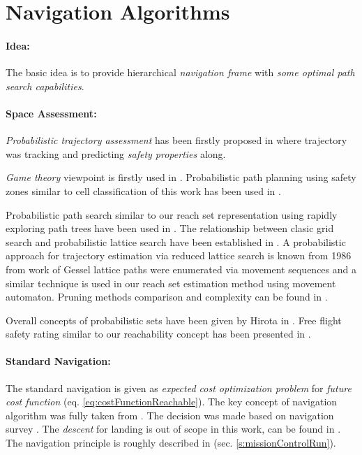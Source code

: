 \newpage
\section{Navigation Algorithms}\label{s:NavigationAlgorithms}
\paragraph{Idea:} The basic idea is to provide hierarchical \emph{navigation frame} with \emph{some optimal path search capabilities}. 


\paragraph{Space Assessment:}\emph{Probabilistic trajectory assessment} has been firstly proposed in \cite{kim2007uav} where trajectory was tracking and predicting \emph{safety properties} along. 

\emph{Game theory} viewpoint is firstly used in \cite{vidal2002probabilistic}. Probabilistic path planning using safety zones similar to cell classification of this work has been used in \cite{pfeiffer2005path}.

Probabilistic path search similar to our reach set representation using rapidly exploring path trees have been used in \cite{kothari2013probabilistically,blackmore2006probabilistic}. The relationship between clasic grid search and probabilistic lattice search have been established in \cite{lavalle2004relationship}. A probabilistic approach for trajectory estimation via reduced lattice search is known from 1986 from work of Gessel \cite{gessel1986probabilistic} lattice paths were enumerated via movement sequences and a similar technique is used in our reach set estimation method using movement automaton.  Pruning methods comparison and complexity can be found in \cite{esposito1997comparative}.

Overall concepts of probabilistic sets have been given by Hirota in \cite{hirota1981concepts}.  Free flight safety rating similar to our reachability concept has been presented in \cite{hoekstra2002designing}.

\paragraph{Standard Navigation:} The standard navigation is given as \emph{expected cost optimization problem} for \emph{future cost function} (eq. \ref{eq:costFunctionReachable}). The key concept of navigation algorithm was fully taken from \cite{gardi2018multi}. The decision was made based on navigation survey \cite{goerzen2010survey}. The \emph{descent} for landing is out of scope in this work, can be found in \cite{lim2018energy}. The navigation principle is roughly described in (sec. \ref{s:missionControlRun}).


